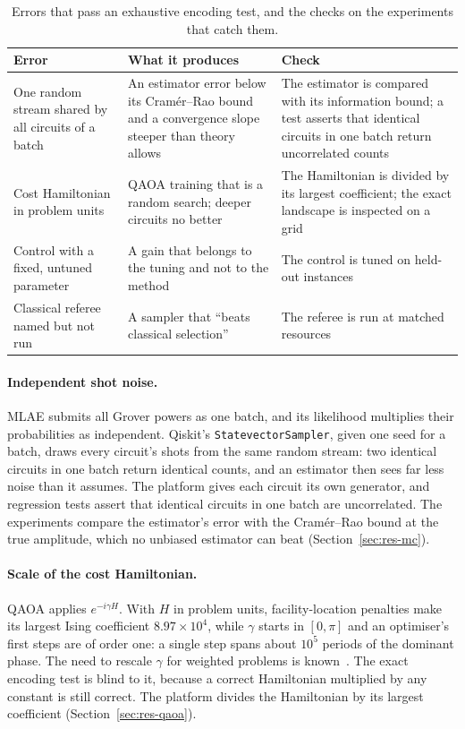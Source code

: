 \documentclass[11pt,a4paper]{article}
\begin{document}
\begin{table}[H]
\centering\small
\begin{tabular}{p{3.3cm}p{5.2cm}p{5.3cm}}
\toprule
Error & What it produces & Check \\
\midrule
One random stream shared by all circuits of a batch & An estimator error below its Cram\'er--Rao bound and a convergence slope steeper than theory allows & The estimator is compared with its information bound; a test asserts that identical circuits in one batch return uncorrelated counts \\
Cost Hamiltonian in problem units & QAOA training that is a random search; deeper circuits no better & The Hamiltonian is divided by its largest coefficient; the exact landscape is inspected on a grid \\
Control with a fixed, untuned parameter & A gain that belongs to the tuning and not to the method & The control is tuned on held-out instances \\
Classical referee named but not run & A sampler that ``beats classical selection'' & The referee is run at matched resources \\
\bottomrule
\end{tabular}
\caption{Errors that pass an exhaustive encoding test, and the checks on the
experiments that catch them.}
\label{tab:audit}
\end{table}

\paragraph{Independent shot noise.} MLAE submits all Grover powers as one
batch, and its likelihood multiplies their probabilities as independent.
Qiskit's \texttt{StatevectorSampler}, given one seed for a batch, draws
every circuit's shots from the same random stream: two identical circuits
in one batch return identical counts, and an estimator then sees far less
noise than it assumes. The platform gives each circuit its own generator,
and regression tests assert that identical circuits in one batch are
uncorrelated. The experiments compare the estimator's error with the
Cram\'er--Rao bound at the true amplitude, which no unbiased estimator can
beat (Section~\ref{sec:res-mc}).

\paragraph{Scale of the cost Hamiltonian.} QAOA applies
$e^{-i\gamma H}$. With $H$ in problem units, facility-location penalties make
its largest Ising coefficient $8.97\times10^{4}$, while $\gamma$ starts in
$[0,\pi]$ and an optimiser's first steps are of order one: a single step
spans about $10^{5}$ periods of the dominant phase. The need to rescale
$\gamma$ for weighted problems is known~\cite{shaydulin2023,sureshbabu2024}.
The exact encoding test is blind to it, because a
correct Hamiltonian multiplied by any constant is still correct. The platform
divides the Hamiltonian by its largest coefficient
(Section~\ref{sec:res-qaoa}).
\end{document}
